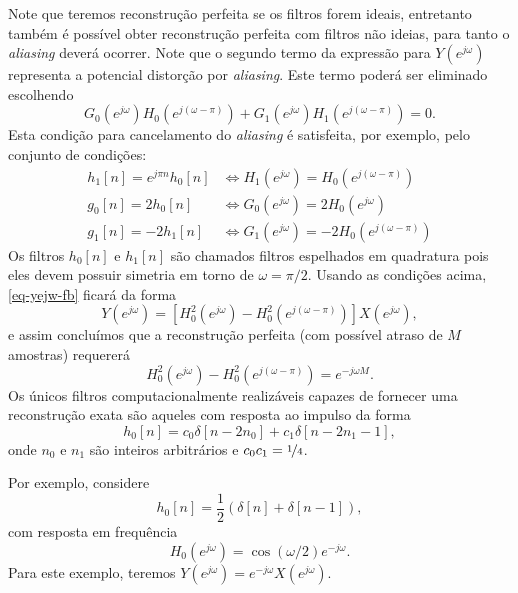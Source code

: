 \begin{frame}[allowframebreaks]
  Note que teremos reconstrução perfeita se os filtros forem ideais, entretanto também é possível 
  obter reconstrução perfeita com filtros não ideias, para tanto o \textit{aliasing} deverá ocorrer.
  Note que o segundo termo da expressão para $Y(e^{j\omega})$ representa a potencial distorção por
  \textit{aliasing}. Este termo poderá ser eliminado escolhendo
  \begin{equation}
  G_0(e^{j\omega}) H_0(e^{j(\omega-\pi)}) + G_1(e^{j\omega}) H_1(e^{j(\omega-\pi)}) = 0.
  \end{equation}
  Esta condição para cancelamento do \textit{aliasing} é satisfeita, por exemplo, pelo conjunto de condições:
  \begin{align}
  h_1[n] = e^{j\pi n} h_0[n]    & \Longleftrightarrow H_1(e^{j\omega}) = H_0(e^{j(\omega-\pi)})  \\
  g_0[n] = 2 h_0[n]             & \Longleftrightarrow G_0(e^{j\omega}) =  2 H_0(e^{j\omega}) \\
  g_1[n] = -2 h_1[n]            & \Longleftrightarrow G_1(e^{j\omega}) =  -2 H_0(e^{j(\omega-\pi)}) 
  \end{align}
  Os filtros $h_0[n]$ e $h_1[n]$ são chamados filtros espelhados em quadratura pois eles devem possuir simetria 
  em torno de $\omega = \pi/2$. Usando as condições acima, \cref{eq-yejw-fb} ficará da forma
  \begin{equation}
  Y(e^{j\omega}) = \left[ H_0^2(e^{j\omega}) - H_0^2(e^{j(\omega-\pi)}) \right] X(e^{j\omega}) ,
  \end{equation}
  e assim concluímos que a reconstrução perfeita (com possível atraso de $M$ amostras) requererá 
  \begin{equation}
  H_0^2(e^{j\omega}) - H_0^2(e^{j(\omega-\pi)})  = e^{-j\omega M} .
  \end{equation}
  Os únicos filtros computacionalmente realizáveis capazes de fornecer uma reconstrução exata são
  aqueles com resposta ao impulso da forma
  \begin{equation}
  h_0[n] = c_0 \delta[n-2n_0] + c_1 \delta[n-2n_1 - 1],  
  \end{equation}
  onde $n_0$ e $n_1$ são inteiros arbitrários e $c_0 c_1 = \nicefrac{1}{4}$.

  Por exemplo, considere
  \begin{equation}
  h_0[n] = \frac{1}{2} (\delta[n] + \delta[n-1]) ,
  \end{equation}
  com resposta em frequência 
  \begin{equation}
  H_0(e^{j\omega}) = \cos(\omega/2) e^{-j\omega} .
  \end{equation}
  Para este exemplo, teremos $Y(e^{j\omega}) = e^{-j\omega} X(e^{j\omega})$.


\end{frame}
